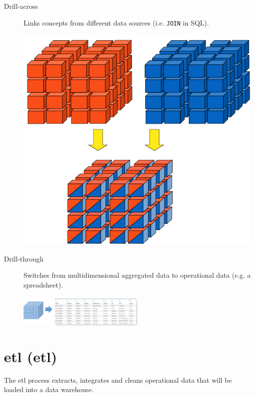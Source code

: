 \begin{description}
    \item[Drill-across] 
        \begin{minipage}{0.7\textwidth}
            Links concepts from different data sources (i.e. \texttt{JOIN} in SQL).
        \end{minipage}
        \hfill
        \begin{minipage}{0.15\textwidth}
            \centering
            \includegraphics[width=\linewidth]{img/olap_drillacross.png}
        \end{minipage}    
    
    \item[Drill-through] 
        Switches from multidimensional aggregated data to operational data (e.g. a spreadsheet).
        \begin{center}
            \includegraphics[width=0.5\textwidth]{img/olap_drillthrough.png}
        \end{center}    
\end{description}



\section{\Acl{etl} (\Ac{etl})}
The \Ac{etl} process extracts, integrates and cleans operational data that will be loaded into a data warehouse.


